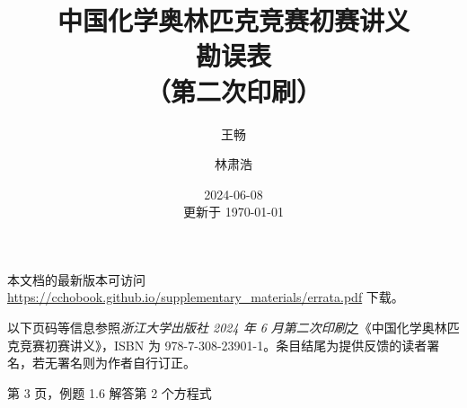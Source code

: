 \documentclass{errata}
\title{中国化学奥林匹克竞赛初赛讲义 \\ {\bfseries 勘误表} \\ （第二次印刷）}
\author{王畅 \and 林肃浩}
\date{2024-06-08 \\ 更新于 \today}
\begin{document}
    \maketitle
    本文档的最新版本可访问 \url{https://cchobook.github.io/supplementary_materials/errata.pdf} 下载。

    以下页码等信息参照\emph{浙江大学出版社 2024 年 6 月第二次印刷}之《中国化学奥林匹克竞赛初赛讲义》，ISBN 为 978-7-308-23901-1。条目结尾为提供反馈的读者署名，若无署名则为作者自行订正。

    \begin{Errata}
        \item[第 3 页，例题 1.6 解答第 2 个方程式]
            \Orig {}
            \Corr {}
    \end{Errata}

    \renewcommand{\em}{\itshape}
    \renewcommand*{\bibfont}{\footnotesize}
    \renewcommand{\refname}{参考文献}
    \renewcommand{\bibname}{参考文献}
    \printbibliography
\end{document}
